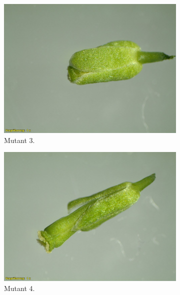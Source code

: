 \documentclass[10pt,a4paper]{article}
\begin{document}
\begin{figure}[!tbp]
\begin{subfigure}[b]{0.45\textwidth}
				\includegraphics[width=\textwidth]{3_O+A(MU).jpg}
				\caption{Mutant 3.}
				\label{fig:f3}
			\end{subfigure}
			\hfill
			\begin{subfigure}[b]{0.45\textwidth}
				\includegraphics[width=\textwidth]{4_O+A(MU).jpg}
				\caption{Mutant 4.}
				\label{fig:f4}
			\end{subfigure}
			\hfill
			\begin{subfigure}[b]{0.45\textwidth}
				\centering

\end{subfigure}
\end{figure}
\end{document}
